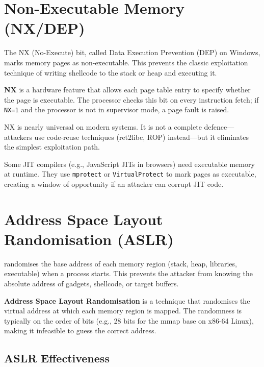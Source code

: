 \section{Non-Executable Memory (NX/DEP)}

The NX (No-Execute) bit, called Data Execution Prevention (DEP) on Windows, marks memory pages as non-executable. This prevents the classic exploitation technique of writing shellcode to the stack or heap and executing it.

\begin{definition}[NX/DEP]
	\textbf{NX} is a hardware feature that allows each page table entry to specify whether the page is executable. The processor checks this bit on every instruction fetch; if \texttt{NX=1} and the processor is not in supervisor mode, a page fault is raised.
\end{definition}

NX is nearly universal on modern systems. It is not a complete defence---attackers use code-reuse techniques (ret2libc, ROP) instead---but it eliminates the simplest exploitation path.

\begin{remark}
	Some JIT compilers (e.g., JavaScript JITs in browsers) need executable memory at runtime. They use \texttt{mprotect} or \texttt{VirtualProtect} to mark pages as executable, creating a window of opportunity if an attacker can corrupt JIT code.
\end{remark}

\section{Address Space Layout Randomisation (ASLR)}

\ASLR{} randomises the base address of each memory region (stack, heap, libraries, executable) when a process starts. This prevents the attacker from knowing the absolute address of gadgets, shellcode, or target buffers.

\begin{definition}[ASLR]
	\textbf{Address Space Layout Randomisation} is a technique that randomises the virtual address at which each memory region is mapped. The randomness is typically on the order of bits (e.g., 28 bits for the mmap base on x86-64 Linux), making it infeasible to guess the correct address.
\end{definition}

\subsection{ASLR Effectiveness}

